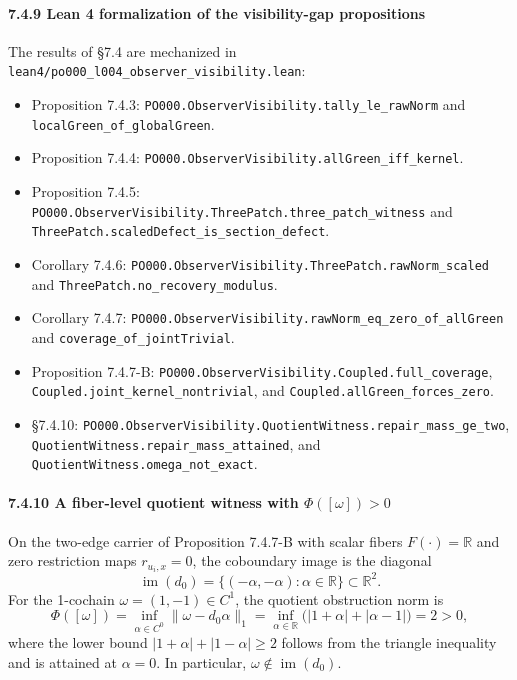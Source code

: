 \documentclass[
  11pt,
]{article}
\providecommand{\tightlist}{%
  \setlength{\itemsep}{0pt}\setlength{\parskip}{0pt}}
\providecommand{\tightlist}{%
  \setlength{\itemsep}{0pt}\setlength{\parskip}{0pt}}
\begin{document}
\paragraph{7.4.9 Lean 4 formalization of the visibility-gap propositions}\label{lean-4-formalization-of-the-visibility-gap-propositions}

The results of §7.4 are mechanized in \texttt{lean4/po000\_l004\_observer\_visibility.lean}:

\begin{itemize}
\tightlist
\item
  Proposition 7.4.3: \texttt{PO000.ObserverVisibility.tally\_le\_rawNorm} and \texttt{localGreen\_of\_globalGreen}.
\item
  Proposition 7.4.4: \texttt{PO000.ObserverVisibility.allGreen\_iff\_kernel}.
\item
  Proposition 7.4.5: \texttt{PO000.ObserverVisibility.ThreePatch.three\_patch\_witness} and \texttt{ThreePatch.scaledDefect\_is\_section\_defect}.
\item
  Corollary 7.4.6: \texttt{PO000.ObserverVisibility.ThreePatch.rawNorm\_scaled} and \texttt{ThreePatch.no\_recovery\_modulus}.
\item
  Corollary 7.4.7: \texttt{PO000.ObserverVisibility.rawNorm\_eq\_zero\_of\_allGreen} and \texttt{coverage\_of\_jointTrivial}.
\item
  Proposition 7.4.7-B: \texttt{PO000.ObserverVisibility.Coupled.full\_coverage}, \texttt{Coupled.joint\_kernel\_nontrivial}, and \texttt{Coupled.allGreen\_forces\_zero}.
\item
  §7.4.10: \texttt{PO000.ObserverVisibility.QuotientWitness.repair\_mass\_ge\_two}, \texttt{QuotientWitness.repair\_mass\_attained}, and \texttt{QuotientWitness.omega\_not\_exact}.
\end{itemize}

\paragraph{\texorpdfstring{7.4.10 A fiber-level quotient witness with \(\Phi([\omega]) > 0\)}{7.4.10 A fiber-level quotient witness with \textbackslash Phi({[}\textbackslash omega{]}) \textgreater{} 0}}\label{a-fiber-level-quotient-witness-with-phiomega-0}

On the two-edge carrier of Proposition 7.4.7-B with scalar fibers \(F(\cdot)=\mathbb R\) and zero restriction maps \(r_{u_i,x}=0\), the coboundary image is the diagonal
\[
\operatorname{im}(d_0)=\{(-\alpha,-\alpha):\alpha\in\mathbb R\} \subset \mathbb R^2.
\]
For the 1-cochain \(\omega=(1,-1)\in C^1\), the quotient obstruction norm is
\[
\Phi([\omega])=\inf_{\alpha\in C^0}\lVert\omega-d_0\alpha\rVert_1
=\inf_{\alpha\in\mathbb R}\bigl(|1+\alpha|+|\alpha-1|\bigr)=2>0,
\]
where the lower bound \(|1+\alpha|+|1-\alpha|\ge 2\) follows from the triangle inequality and is attained at \(\alpha=0\). In particular, \(\omega\notin\operatorname{im}(d_0)\).
\end{document}
